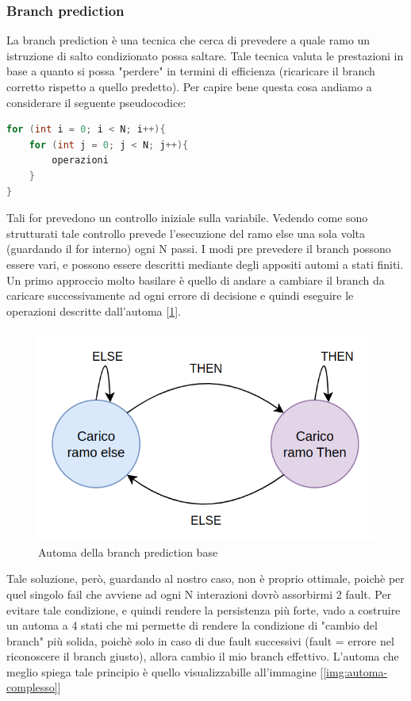 \subsubsection{Branch prediction}
La branch prediction è una tecnica che cerca di prevedere a quale ramo un istruzione di salto condizionato possa saltare. Tale tecnica valuta le prestazioni in base a quanto si possa "perdere" in termini di efficienza (ricaricare il branch corretto rispetto a quello predetto).
Per capire bene questa cosa andiamo a considerare il seguente pseudocodice:
\begin{lstlisting}[language=C]
for (int i = 0; i < N; i++){
    for (int j = 0; j < N; j++){
        operazioni
    }
}
\end{lstlisting}

Tali for prevedono un controllo iniziale sulla variabile. Vedendo come sono strutturati tale controllo prevede l'esecuzione del ramo else una sola volta (guardando il for interno) ogni N passi.
I modi pre prevedere il branch possono essere vari, e possono essere descritti mediante degli appositi automi a stati finiti. Un primo approccio molto basilare è quello di andare a cambiare il branch da caricare successivamente ad ogni errore di decisione e quindi eseguire le operazioni descritte dall'automa [\ref{img:automa-semplice}].

\begin{figure}[!ht]
    \centering
    \includegraphics[width=.5\textwidth]{img/automa-semplice.png}
    \caption{Automa della branch prediction base}\label{img:automa-semplice}
\end{figure}

Tale soluzione, però, guardando al nostro caso, non è proprio ottimale, poichè per quel singolo fail che avviene ad ogni N interazioni dovrò assorbirmi 2 fault. Per evitare tale condizione, e quindi rendere la persistenza più forte, vado a costruire un automa a 4 stati che mi permette di rendere la condizione di "cambio del branch" più solida, poichè solo in caso di due fault successivi (fault = errore nel riconoscere il branch giusto), allora cambio il mio branch effettivo. L'automa che meglio spiega tale principio è quello visualizzabille all'immagine [\ref{img:automa-complesso}]

